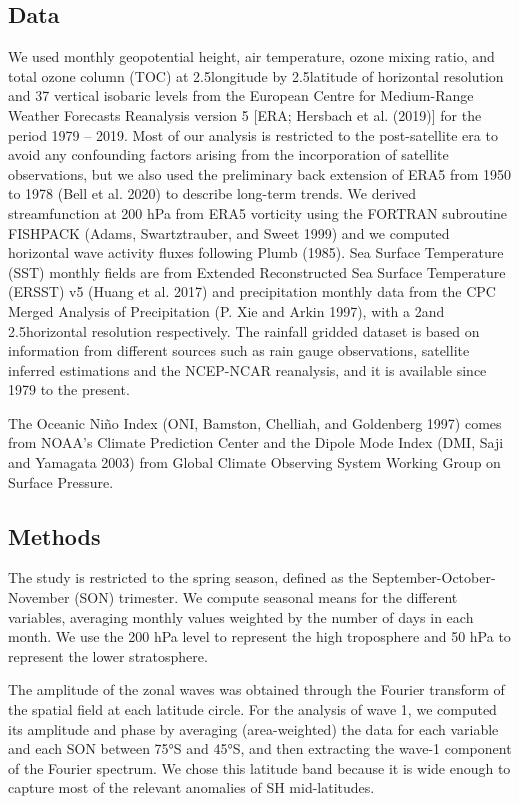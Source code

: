 \documentclass[smallextended]{svjour3}       %
\begin{document}
\hypertarget{data}{%
\subsection{Data}\label{data}}

We used monthly geopotential height, air temperature, ozone mixing ratio, and total ozone column (TOC) at 2.5\degree longitude by 2.5\degree latitude of horizontal resolution and 37 vertical isobaric levels from the European Centre for Medium-Range Weather Forecasts Reanalysis version 5 {[}ERA; Hersbach et al. (2019){]} for the period 1979 -- 2019.
Most of our analysis is restricted to the post-satellite era to avoid any confounding factors arising from the incorporation of satellite observations, but we also used the preliminary back extension of ERA5 from 1950 to 1978 (Bell et al. 2020) to describe long-term trends.
We derived streamfunction at 200 hPa from ERA5 vorticity using the FORTRAN subroutine FISHPACK (Adams, Swartztrauber, and Sweet 1999) and we computed horizontal wave activity fluxes following Plumb (1985).
Sea Surface Temperature (SST) monthly fields are from Extended Reconstructed Sea Surface Temperature (ERSST) v5 (Huang et al. 2017) and precipitation monthly data from the CPC Merged Analysis of Precipitation (P. Xie and Arkin 1997), with a 2\degree and 2.5\degree horizontal resolution respectively.
The rainfall gridded dataset is based on information from different sources such as rain gauge observations, satellite inferred estimations and the NCEP-NCAR reanalysis, and it is available since 1979 to the present.

The Oceanic Niño Index (ONI, Bamston, Chelliah, and Goldenberg 1997) comes from NOAA's Climate Prediction Center and the Dipole Mode Index (DMI, Saji and Yamagata 2003) from Global Climate Observing System Working Group on Surface Pressure.

\hypertarget{methods-1}{%
\subsection{Methods}\label{methods-1}}

The study is restricted to the spring season, defined as the September-October-November (SON) trimester.
We compute seasonal means for the different variables, averaging monthly values weighted by the number of days in each month.
We use the 200 hPa level to represent the high troposphere and 50 hPa to represent the lower stratosphere.

The amplitude of the zonal waves was obtained through the Fourier transform of the spatial field at each latitude circle.
For the analysis of wave 1, we computed its amplitude and phase by averaging (area-weighted) the data for each variable and each SON between 75°S and 45°S, and then extracting the wave-1 component of the Fourier spectrum.
We chose this latitude band because it is wide enough to capture most of the relevant anomalies of SH mid-latitudes.
\end{document}
